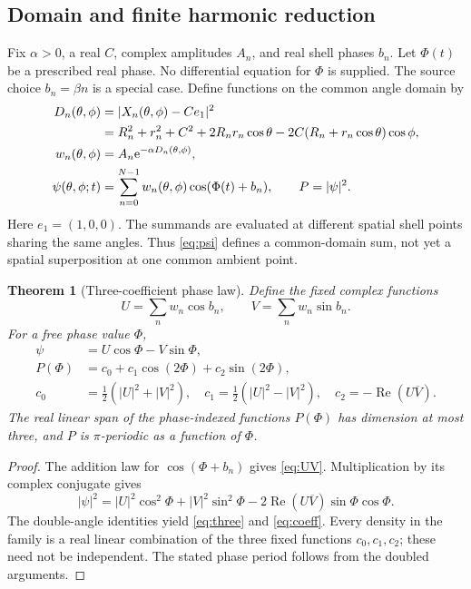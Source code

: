 \documentclass[11pt,a4paper]{article}
\newtheorem{theorem}{Theorem}[section]
\theoremstyle{definition}
\theoremstyle{remark}
\newcommand{\e}{\mathrm e}
\newcommand{\Rea}{\operatorname{Re}}
\begin{document}
\subsection{Domain and finite harmonic reduction}
Fix $\alpha>0$, a real $C$, complex amplitudes $A_n$, and real
shell phases $b_n$. Let $\Phi(t)$ be a prescribed real phase.
No differential equation for $\Phi$ is supplied. The source
choice $b_n=\beta n$ is a special case. Define functions on the
common angle domain by
\begin{align}
 D_n(\theta,\phi)&=|X_n(\theta,\phi)-C e_1|^2 \notag\\
 &=R_n^2+r_n^2+C^2+2R_nr_n\cos\theta
      -2C(R_n+r_n\cos\theta)\cos\phi, \label{eq:D}\\
 w_n(\theta,\phi)&=A_n\e^{-\alpha D_n(\theta,\phi)}, \notag\\
 \psi(\theta,\phi;t)&=\sum_{n=0}^{N-1}
                 w_n(\theta,\phi)\cos(\Phi(t)+b_n),\qquad
 P=|\psi|^2. \label{eq:psi}
\end{align}
Here $e_1=(1,0,0)$. The summands are evaluated at different
spatial shell points sharing the same angles. Thus
\eqref{eq:psi} defines a common-domain sum, not yet a spatial
superposition at one common ambient point.

\begin{theorem}[Three-coefficient phase law]
\label{thm:phase}
Define the fixed complex functions
\[
 U=\sum_n w_n\cos b_n,\qquad V=\sum_n w_n\sin b_n.
\]
For a free phase value $\Phi$,
\begin{align}
 \psi&=U\cos\Phi-V\sin\Phi, \label{eq:UV}\\
 P(\Phi)&=c_0+c_1\cos(2\Phi)+c_2\sin(2\Phi), \label{eq:three}\\
 c_0&=\tfrac12(|U|^2+|V|^2),\quad
 c_1=\tfrac12(|U|^2-|V|^2),\quad
 c_2=-\Rea(U\overline V). \label{eq:coeff}
\end{align}
The real linear span of the phase-indexed functions $P(\Phi)$
has dimension at most three, and $P$ is $\pi$-periodic as a
function of $\Phi$.
\end{theorem}
\begin{proof}
The addition law for $\cos(\Phi+b_n)$ gives \eqref{eq:UV}.
Multiplication by its complex conjugate gives
\[
 |\psi|^2=|U|^2\cos^2\Phi+|V|^2\sin^2\Phi
       -2\Rea(U\overline V)\sin\Phi\cos\Phi.
\]
The double-angle identities yield \eqref{eq:three} and
\eqref{eq:coeff}. Every density in the family is a real
linear combination of the three fixed functions $c_0,c_1,c_2$;
these need not be independent. The stated phase period follows
from the doubled arguments.
\end{proof}
\end{document}
